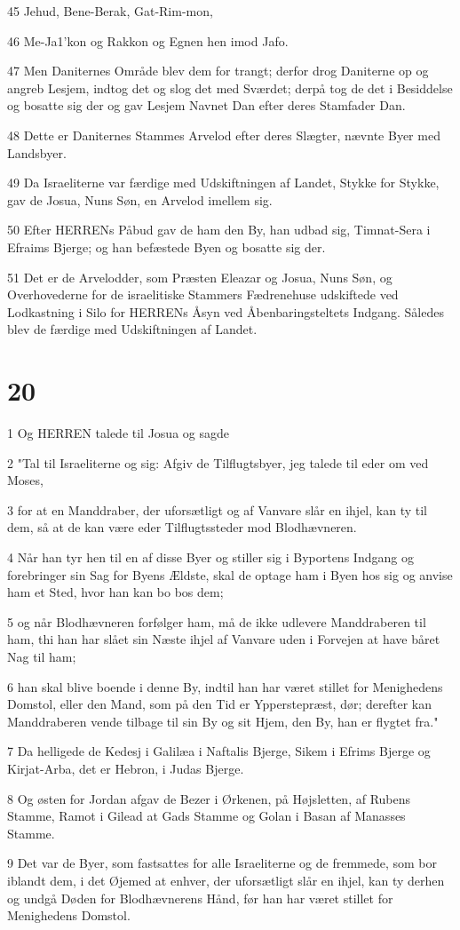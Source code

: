 \par 45 Jehud, Bene-Berak, Gat-Rim-mon,
\par 46 Me-Ja1'kon og Rakkon og Egnen hen imod Jafo.
\par 47 Men Daniternes Område blev dem for trangt; derfor drog Daniterne op og angreb Lesjem, indtog det og slog det med Sværdet; derpå tog de det i Besiddelse og bosatte sig der og gav Lesjem Navnet Dan efter deres Stamfader Dan.
\par 48 Dette er Daniternes Stammes Arvelod efter deres Slægter, nævnte Byer med Landsbyer.
\par 49 Da Israeliterne var færdige med Udskiftningen af Landet, Stykke for Stykke, gav de Josua, Nuns Søn, en Arvelod imellem sig.
\par 50 Efter HERRENs Påbud gav de ham den By, han udbad sig, Timnat-Sera i Efraims Bjerge; og han befæstede Byen og bosatte sig der.
\par 51 Det er de Arvelodder, som Præsten Eleazar og Josua, Nuns Søn, og Overhovederne for de israelitiske Stammers Fædrenehuse udskiftede ved Lodkastning i Silo for HERRENs Åsyn ved Åbenbaringsteltets Indgang. Således blev de færdige med Udskiftningen af Landet.

\chapter{20}

\par 1 Og HERREN talede til Josua og sagde
\par 2 "Tal til Israeliterne og sig: Afgiv de Tilflugtsbyer, jeg talede til eder om ved Moses,
\par 3 for at en Manddraber, der uforsætligt og af Vanvare slår en ihjel, kan ty til dem, så at de kan være eder Tilflugtssteder mod Blodhævneren.
\par 4 Når han tyr hen til en af disse Byer og stiller sig i Byportens Indgang og forebringer sin Sag for Byens Ældste, skal de optage ham i Byen hos sig og anvise ham et Sted, hvor han kan bo bos dem;
\par 5 og når Blodhævneren forfølger ham, må de ikke udlevere Manddraberen til ham, thi han har slået sin Næste ihjel af Vanvare uden i Forvejen at have båret Nag til ham;
\par 6 han skal blive boende i denne By, indtil han har været stillet for Menighedens Domstol, eller den Mand, som på den Tid er Ypperstepræst, dør; derefter kan Manddraberen vende tilbage til sin By og sit Hjem, den By, han er flygtet fra."
\par 7 Da helligede de Kedesj i Galilæa i Naftalis Bjerge, Sikem i Efrims Bjerge og Kirjat-Arba, det er Hebron, i Judas Bjerge.
\par 8 Og østen for Jordan afgav de Bezer i Ørkenen, på Højsletten, af Rubens Stamme, Ramot i Gilead at Gads Stamme og Golan i Basan af Manasses Stamme.
\par 9 Det var de Byer, som fastsattes for alle Israeliterne og de fremmede, som bor iblandt dem, i det Øjemed at enhver, der uforsætligt slår en ihjel, kan ty derhen og undgå Døden for Blodhævnerens Hånd, før han har været stillet for Menighedens Domstol.

